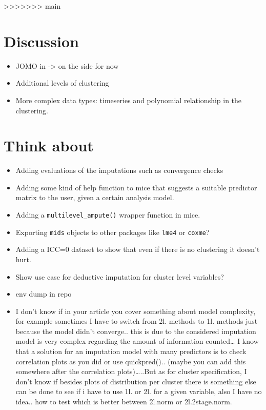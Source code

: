 \documentclass[
]{jss}
\begin{document}
>>>>>>> main
\hypertarget{discussion}{%
\section{Discussion}\label{discussion}}

\begin{itemize}
\item
  JOMO in  -\textgreater{} on the side for now
\item
  Additional levels of clustering
\item
  More complex data types: timeseries and polynomial relationship in the
  clustering.
\end{itemize}

\hypertarget{think-about}{%
\section{Think about}\label{think-about}}

\begin{itemize}
\item
  Adding evaluations of the imputations such as convergence checks
\item
  Adding some kind of help function to mice that suggests a suitable
  predictor matrix to the user, given a certain analysis model.
\item
  Adding a \texttt{multilevel\_ampute()} wrapper function in mice.
\item
  Exporting \texttt{mids} objects to other packages like \texttt{lme4}
  or \texttt{coxme}?
\item
  Adding a ICC=0 dataset to show that even if there is no clustering it
  doesn't hurt.
\item
  Show use case for deductive imputation for cluster level variables?
\item
  env dump in repo
\item
  I don't know if in your article you cover something about model
  complexity, for example sometimes I have to switch from 2l. methods to
  1l. methods just because the model didn't converge.. this is due to
  the considered imputation model is very complex regarding the amount
  of information counted\ldots{} I know that a solution for an
  imputation model with many predictors is to check correlation plots as
  you did or use quickpred().. (maybe you can add this somewhere after
  the correlation plots)\ldots..But as for cluster specification, I
  don't know if besides plots of distribution per cluster there is
  something else can be done to see if i have to use 1l. or 2l. for a
  given variable, also I have no idea.. how to test which is better
  between 2l.norm or 2l.2stage.norm.
\end{itemize}
\end{document}
